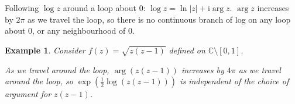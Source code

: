 \documentclass{article}
\theoremstyle{plain}\theoremheaderfont{\normalfont\itshape}\theorembodyfont{\rmfamily}\theoremseparator{.}\newtheorem*{rem}{Remark}\newtheorem*{ex}{Example}\newtheorem*{proof}{Proof}\newtheorem*{altp}{Alternative proof}\newtheorem*{con}{Consequences}\newtheorem*{notn}{Notations}\newtheorem*{cau}{Caution}\newtheorem*{term}{Terminology}\newtheorem*{keyex}{Key example}
\theoremstyle{plain}\theoremheaderfont{\normalfont\bfseries}\theorembodyfont{\rmfamily}\theoremseparator{.}\newtheorem{thm}{Theorem}[section]\newtheorem{lem}[thm]{Lemma}\newtheorem{prop}[thm]{Proposition}\newtheorem*{cor}{Corollary}\newtheorem{defn}[thm]{Definition}\newtheorem{clm}[thm]{Claim}\newtheorem{clminproof}{Claim}\newtheorem{leminproof}{Lemma}\newtheorem{app}{Application}
\theoremstyle{break}\theoremheaderfont{\normalfont\itshape}\theorembodyfont{\rmfamily}\theoremseparator{.\medskip}\newtheorem*{proofskip}{Proof}\newtheorem*{exs}{Examples}\newtheorem*{rems}{Remarks}\newtheorem*{rec}{Recall}\newtheorem*{ppts}{Properties}
\theoremstyle{break}\theoremheaderfont{\normalfont\bfseries}\theorembodyfont{\rmfamily}\theoremseparator{.\medskip}\newtheorem{lemskip}[thm]{Lemma}\newtheorem{defnskip}[thm]{Definition}\newtheorem{propskip}[thm]{Proposition}\newtheorem{thmskip}[thm]{Theorem}
\numberwithin{equation}{section}
\newcommand{\ii}{\mathrm{i}}
\newcommand{\abs}[1]{\left|#1\right|}
\newcommand{\CC}{\mathbb{C}}
\begin{document}
    Following \(\log z\) around a loop about \(0\): \(\log z=\ln\abs{z}+\ii\arg z\). \(\arg z\) increases by \(2\pi\) as we travel the loop, so there is no continuous branch of log on any loop about 0, or any neighbourhood of 0.

    \begin{ex}
        Consider \(f(z)=\sqrt{z(z-1)}\) defined on \(\CC\setminus[0,1]\).
        
        As we travel around the loop, \(\arg(z(z-1))\) increases by \(4\pi\) as we travel around the loop, so \(\exp(\frac{1}{2}\log(z(z-1)))\) is independent of the choice of argument for \(z(z-1)\).
        \begin{figure}[ht!]
            \centering
        \end{figure}
    \end{ex}

    \newpage
\end{document}

